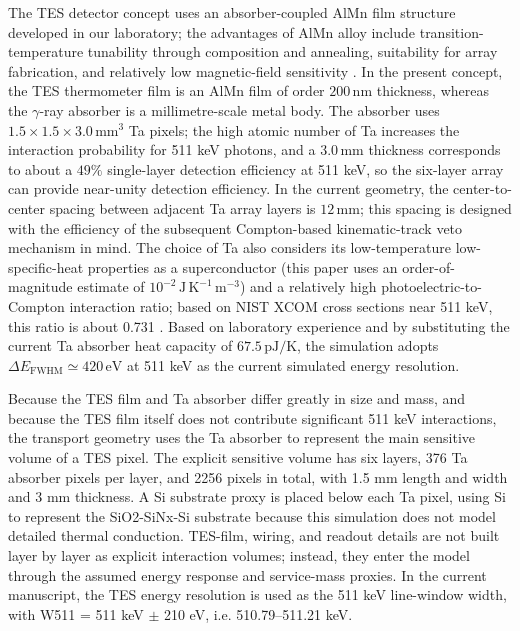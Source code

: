 \documentclass[11pt]{article}
\begin{document}
The TES detector concept uses an absorber-coupled AlMn film structure developed in our laboratory; the advantages of AlMn alloy include transition-temperature tunability through composition and annealing, suitability for array fabrication, and relatively low magnetic-field sensitivity \cite{Xie2026AlMn,Vavagiakis2017AlMnMagnetic}. In the present concept, the TES thermometer film is an AlMn film of order $200\,\mathrm{nm}$ thickness, whereas the $\gamma$-ray absorber is a millimetre-scale metal body. The absorber uses $1.5\times1.5\times3.0\,\mathrm{mm^3}$ Ta pixels; the high atomic number of Ta increases the interaction probability for 511 keV photons, and a $3.0\,\mathrm{mm}$ thickness corresponds to about a $49\%$ single-layer detection efficiency at 511 keV, so the six-layer array can provide near-unity detection efficiency. In the current geometry, the center-to-center spacing between adjacent Ta array layers is $12\,\mathrm{mm}$; this spacing is designed with the efficiency of the subsequent Compton-based kinematic-track veto mechanism in mind. The choice of Ta also considers its low-temperature low-specific-heat properties as a superconductor (this paper uses an order-of-magnitude estimate of $10^{-2}\,\mathrm{J\,K^{-1}\,m^{-3}}$) and a relatively high photoelectric-to-Compton interaction ratio; based on NIST XCOM cross sections near 511 keV, this ratio is about 0.731 \cite{NISTXCOM}. Based on laboratory experience and by substituting the current Ta absorber heat capacity of $67.5\,\mathrm{pJ/K}$, the simulation adopts $\Delta E_{\mathrm{FWHM}}\simeq420\,\mathrm{eV}$ at 511 keV as the current simulated energy resolution.

Because the TES film and Ta absorber differ greatly in size and mass, and because the TES film itself does not contribute significant 511 keV interactions, the transport geometry uses the Ta absorber to represent the main sensitive volume of a TES pixel. The explicit sensitive volume has six layers, 376 Ta absorber pixels per layer, and 2256 pixels in total, with 1.5 mm length and width and 3 mm thickness. A Si substrate proxy is placed below each Ta pixel, using Si to represent the SiO2-SiNx-Si substrate because this simulation does not model detailed thermal conduction. TES-film, wiring, and readout details are not built layer by layer as explicit interaction volumes; instead, they enter the model through the assumed energy response and service-mass proxies. In the current manuscript, the TES energy resolution is used as the 511 keV line-window width, with W511 = 511 keV $\pm$ 210 eV, i.e. 510.79--511.21 keV.
\end{document}
